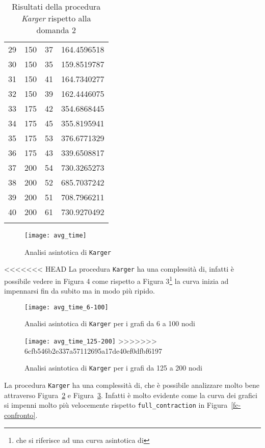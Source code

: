 \begin{center}
\begin{longtable}{|c|c|c|c|}
		29 & 150 & 37 & 164.4596518 \\		
		30 & 150 & 35 & 159.8519787 \\		 	
		31 & 150 & 41 & 164.7340277 \\		
		32 & 150 & 39 & 162.4446075 \\		
		33 & 175 & 42 & 354.6868445 \\		
		34 & 175 & 45 & 355.8195941 \\		 
		35 & 175 & 53 & 376.6771329 \\		   
		36 & 175 & 43 & 339.6508817 \\		
		37 & 200 & 54 & 730.3265273 \\		
		38 & 200 & 52 & 685.7037242 \\		
		39 & 200 & 51 & 708.7966211 \\		
		40 & 200 & 61 & 730.9270492 \\			
		\hline
		\caption{Risultati della procedura \textit{Karger} rispetto alla domanda 2}
		\label{k-results}
	\end{longtable}
\end{center}\vspace{-40pt}

\begin{figure}[H]
	\centering
	\texttt{[image: avg\_time]}
	\caption{Analisi asintotica di \texttt{Karger}}
	\label{k-confronto}
\end{figure}

<<<<<<< HEAD
La procedura \texttt{Karger} ha una complessità di, infatti è possibile vedere in Figura 4 come rispetto a Figura 3\footnote{che si riferisce ad una curva asintotica di } la curva inizia ad impennarsi fin da subito ma in modo più ripido.

\begin{figure}[H]
	\centering
	\texttt{[image: avg\_time\_6-100]}
	\caption{Analisi asintotica di \texttt{Karger} per i grafi da 6 a 100 nodi}
	\label{k-confronto1}
\end{figure}

\begin{figure}[H]
	\centering
	\texttt{[image: avg\_time\_125-200]}
>>>>>>> 6cfb546b2e337a57112695a17de40ef0dfbf6197
	\caption{Analisi asintotica di \texttt{Karger} per i grafi da 125 a 200 nodi}
	\label{k-confronto2}
\end{figure}

La procedura \texttt{Karger} ha una complessità di, che è possibile analizzare molto bene attraverso Figura~\ref{k-confronto1} e Figura~\ref{k-confronto2}. Infatti è molto evidente come la curva dei grafici si impenni molto più velocemente rispetto \texttt{full\_contraction} in Figura~\ref{fc-confronto}.

